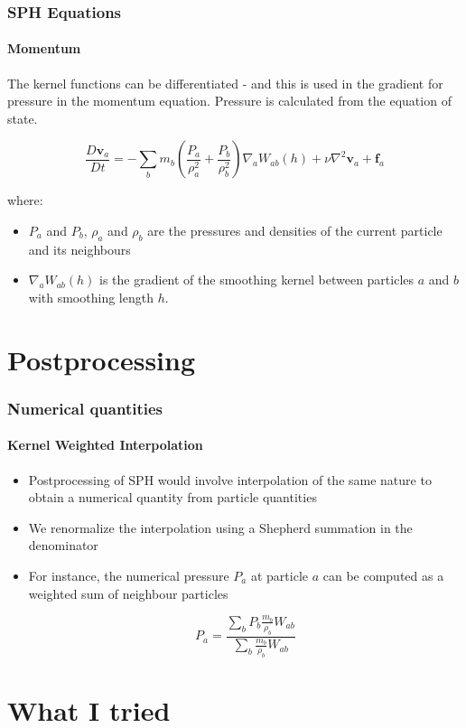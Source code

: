 \documentclass[notheorems, aspectratio=169]{beamer}
\begin{document}
    \begin{frame}[fragile]
      \frametitle{SPH Equations}
      \framesubtitle{Momentum}
      
      The kernel functions can be differentiated - and this is used in the gradient for pressure in the momentum equation. Pressure is calculated from the equation of state. 
      
      \begin{equation}
      \frac{D\mathbf{v}_a}{Dt} = -\sum_b m_b \left( \frac{P_a}{\rho_a^2} + \frac{P_b}{\rho_b^2} \right) \nabla_a W_{ab}(h)
      + \nu \nabla^2 \mathbf{v}_a + \mathbf{f}_a
      \end{equation}
      
      where:
      \begin{itemize}

        \item \( P_a \) and \( P_b \), \( \rho_a \) and \( \rho_b \) are the pressures and densities of the current particle and its neighbours 
        \item \( \nabla_a W_{ab}(h) \) is the gradient of the smoothing kernel between particles \( a \) and \( b \) with smoothing length \( h \).
      \end{itemize}
      
      \end{frame}

      
      \section{Postprocessing} 
      \frame{\tableofcontents[currentsection]}

      \begin{frame}

      \frametitle{Numerical quantities}
      \framesubtitle{Kernel Weighted Interpolation}
      
      \begin{itemize}
       \item Postprocessing of SPH would involve interpolation of the same nature to obtain a numerical quantity from particle quantities
       \item We renormalize the interpolation using a Shepherd summation in the denominator
        \item  For instance, the numerical pressure \(P_a\) at particle \(a\) can be computed as a weighted sum of neighbour particles

       \[
        P_a = \frac{\sum_b P_b \frac{m_b}{\rho_b} W_{ab}}{\sum_b \frac{m_b}{\rho_b} W_{ab}}
        \]

      \end{itemize}

      \end{frame}


  \section{What I tried} 
  \frame{\tableofcontents[currentsection]}
      
\end{document}
